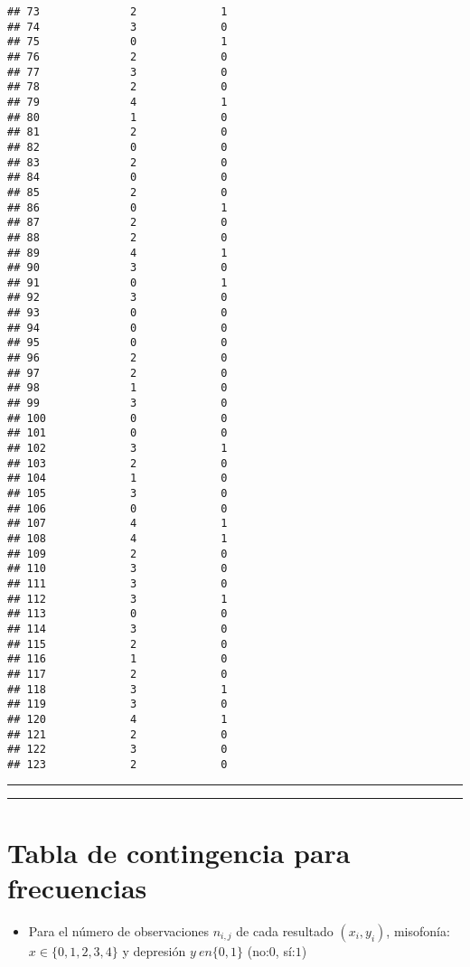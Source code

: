 \documentclass[
]{book}
\providecommand{\tightlist}{%
  \setlength{\itemsep}{0pt}\setlength{\parskip}{0pt}}
\begin{document}
\begin{verbatim}
## 73              2             1
## 74              3             0
## 75              0             1
## 76              2             0
## 77              3             0
## 78              2             0
## 79              4             1
## 80              1             0
## 81              2             0
## 82              0             0
## 83              2             0
## 84              0             0
## 85              2             0
## 86              0             1
## 87              2             0
## 88              2             0
## 89              4             1
## 90              3             0
## 91              0             1
## 92              3             0
## 93              0             0
## 94              0             0
## 95              0             0
## 96              2             0
## 97              2             0
## 98              1             0
## 99              3             0
## 100             0             0
## 101             0             0
## 102             3             1
## 103             2             0
## 104             1             0
## 105             3             0
## 106             0             0
## 107             4             1
## 108             4             1
## 109             2             0
## 110             3             0
## 111             3             0
## 112             3             1
## 113             0             0
## 114             3             0
## 115             2             0
## 116             1             0
## 117             2             0
## 118             3             1
## 119             3             0
## 120             4             1
## 121             2             0
## 122             3             0
## 123             2             0
\end{verbatim}

\begin{center}\rule{0.5\linewidth}{0.5pt}\end{center}

\begin{center}\rule{0.5\linewidth}{0.5pt}\end{center}

\hypertarget{tabla-de-contingencia-para-frecuencias}{%
\section{Tabla de contingencia para frecuencias}\label{tabla-de-contingencia-para-frecuencias}}

\begin{itemize}
\tightlist
\item
  Para el número de observaciones \(n_{i,j}\) de cada resultado \((x_i, y_i)\), misofonía: \(x\in \{0,1,2,3,4\}\) y depresión \(y\ en \{0,1\}\) (no:\(0\), sí:\(1\))
\end{itemize}
\end{document}
